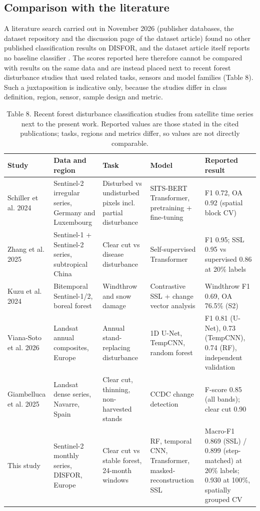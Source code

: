 \documentclass[11pt,a4paper]{article}
\begin{document}
\subsection{Comparison with the literature}
A literature search carried out in November 2026 (publisher databases, the dataset repository and the discussion page of the dataset article) found no other published classification results on DISFOR, and the dataset article itself reports no baseline classifier \cite{ref1}. The scores reported here therefore cannot be compared with results on the same data and are instead placed next to recent forest disturbance studies that used related tasks, sensors and model families (Table 8). Such a juxtaposition is indicative only, because the studies differ in class definition, region, sensor, sample design and metric.

\begin{table}[htbp]
\centering
\footnotesize
\caption{Table 8. Recent forest disturbance classification studies from satellite time series next to the present work. Reported values are those stated in the cited publications; tasks, regions and metrics differ, so values are not directly comparable.}
\begin{tabular}{p{2.4cm}p{3.2cm}p{3.0cm}p{3.0cm}p{3.6cm}}
\toprule
Study & Data and region & Task & Model & Reported result \\ \midrule
Schiller et al. 2024 \cite{ref27} & Sentinel-2 irregular series, Germany and Luxembourg & Disturbed vs undisturbed pixels incl. partial disturbance & SITS-BERT Transformer, pretraining + fine-tuning & F1 0.72, OA 0.92 (spatial block CV) \\
Zhang et al. 2025 \cite{ref2} & Sentinel-1 + Sentinel-2 series, subtropical China & Clear cut vs disease disturbance & Self-supervised Transformer & F1 0.95; SSL 0.95 vs supervised 0.86 at 20\% labels \\
Kuzu et al. 2024 \cite{ref29} & Bitemporal Sentinel-1/2, boreal forest & Windthrow and snow damage & Contrastive SSL + change vector analysis & Windthrow F1 0.69, OA 76.5\% (S2) \\
Viana-Soto et al. 2026 \cite{ref28} & Landsat annual composites, Europe & Annual stand-replacing disturbance & 1D U-Net, TempCNN, random forest & F1 0.81 (U-Net), 0.73 (TempCNN), 0.74 (RF), independent validation \\
Giambelluca et al. 2025 \cite{ref30} & Landsat dense series, Navarre, Spain & Clear cut, thinning, non-harvested stands & CCDC change detection & F-score 0.85 (all bands); clear cut 0.90 \\
This study & Sentinel-2 monthly series, DISFOR, Europe & Clear cut vs stable forest, 24-month windows & RF, temporal CNN, Transformer, masked-reconstruction SSL & Macro-F1 0.869 (SSL) / 0.899 (step-matched) at 20\% labels; 0.930 at 100\%, spatially grouped CV \\
\bottomrule
\end{tabular}
\end{table}
\end{document}
